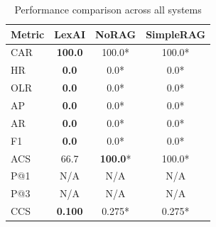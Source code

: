 \begin{table}[ht]
\centering
\caption{Performance comparison across all systems}
\label{tab:main_results}
\begin{tabular}{lccc}
\toprule
\textbf{Metric} & \textbf{LexAI} & \textbf{NoRAG} & \textbf{SimpleRAG} \\
\midrule
CAR & \textbf{100.0} & 100.0* & 100.0* \\
HR & \textbf{0.0} & 0.0* & 0.0* \\
OLR & \textbf{0.0} & 0.0* & 0.0* \\
AP & \textbf{0.0} & 0.0* & 0.0* \\
AR & \textbf{0.0} & 0.0* & 0.0* \\
F1 & \textbf{0.0} & 0.0* & 0.0* \\
ACS & 66.7 & \textbf{100.0}* & 100.0* \\
P@1 & N/A & N/A & N/A \\
P@3 & N/A & N/A & N/A \\
CCS & \textbf{0.100} & 0.275* & 0.275* \\
\bottomrule
\end{tabular}
\end{table}